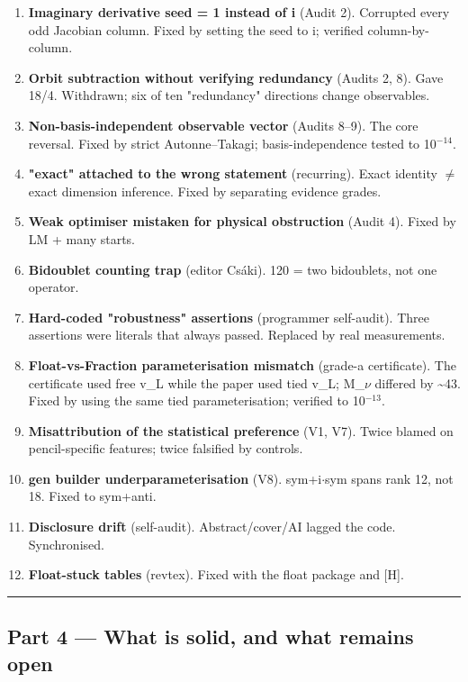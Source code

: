 \documentclass[11pt]{article}
\begin{document}
\begin{enumerate}
\item \textbf{Imaginary derivative seed = 1 instead of i} (Audit 2). Corrupted every odd
   Jacobian column. Fixed by setting the seed to i; verified column-by-column.
\item \textbf{Orbit subtraction without verifying redundancy} (Audits 2, 8). Gave 18/4.
   Withdrawn; six of ten "redundancy" directions change observables.
\item \textbf{Non-basis-independent observable vector} (Audits 8--9). The core reversal.
   Fixed by strict Autonne--Takagi; basis-independence tested to 10$^{-14}$.
\item \textbf{"exact" attached to the wrong statement} (recurring). Exact identity $\neq$ exact
   dimension inference. Fixed by separating evidence grades.
\item \textbf{Weak optimiser mistaken for physical obstruction} (Audit 4). Fixed by LM +
   many starts.
\item \textbf{Bidoublet counting trap} (editor Cs\'aki). 120 = two bidoublets, not one operator.
\item \textbf{Hard-coded "robustness" assertions} (programmer self-audit). Three assertions
   were literals that always passed. Replaced by real measurements.
\item \textbf{Float-vs-Fraction parameterisation mismatch} (grade-a certificate). The
   certificate used free v\_L while the paper used tied v\_L; M\_$\nu$ differed by \textasciitilde{}43.
   Fixed by using the same tied parameterisation; verified to 10$^{-13}$.
\item \textbf{Misattribution of the statistical preference} (V1, V7). Twice blamed on
   pencil-specific features; twice falsified by controls.
\item \textbf{gen builder underparameterisation} (V8). sym+i$\cdot$sym spans rank 12, not 18.
    Fixed to sym+anti.
\item \textbf{Disclosure drift} (self-audit). Abstract/cover/AI lagged the code. Synchronised.
\item \textbf{Float-stuck tables} (revtex). Fixed with the float package and [H].
\end{enumerate}

\vspace{4pt}\hrule\vspace{4pt}

\subsection*{Part 4 --- What is solid, and what remains open}
\end{document}
